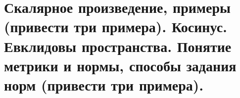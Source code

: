 \section{
    Скалярное произведение, примеры (привести три примера). Косинус. Евклидовы пространства. Понятие метрики и нормы, способы задания норм (привести три примера). 
}




\newpage





\newpage





\newpage





\newpage



